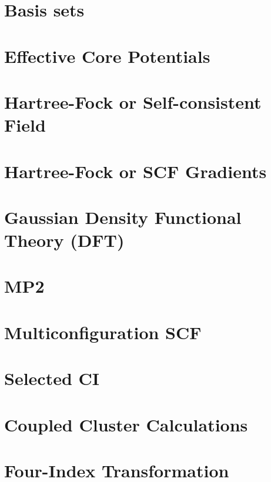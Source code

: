 \chapter{Basis sets}


\chapter{Effective Core Potentials}


\chapter{Hartree-Fock or Self-consistent Field} 


\chapter{Hartree-Fock or SCF Gradients}


\chapter{Gaussian Density Functional Theory (DFT)}


\chapter{MP2}


\chapter{Multiconfiguration SCF}


\chapter{Selected CI}


\chapter{Coupled Cluster Calculations}


\chapter{Four-Index Transformation}



